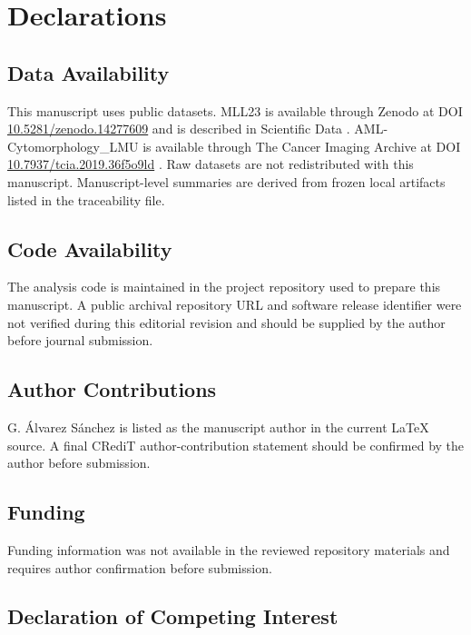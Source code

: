 \section*{Declarations}

\subsection*{Data Availability}

This manuscript uses public datasets. MLL23 is available through Zenodo at DOI \href{https://doi.org/10.5281/zenodo.14277609}{10.5281/zenodo.14277609} and is described in Scientific Data \cite{mll23_nature_2025,mll23_zenodo_2024}. AML-Cytomorphology\_LMU is available through The Cancer Imaging Archive at DOI \href{https://doi.org/10.7937/tcia.2019.36f5o9ld}{10.7937/tcia.2019.36f5o9ld} \cite{aml_lmu_tcia_2019}. Raw datasets are not redistributed with this manuscript. Manuscript-level summaries are derived from frozen local artifacts listed in the traceability file.

\subsection*{Code Availability}

The analysis code is maintained in the project repository used to prepare this manuscript. A public archival repository URL and software release identifier were not verified during this editorial revision and should be supplied by the author before journal submission.

\subsection*{Author Contributions}

G. Álvarez Sánchez is listed as the manuscript author in the current LaTeX source. A final CRediT author-contribution statement should be confirmed by the author before submission.

\subsection*{Funding}

Funding information was not available in the reviewed repository materials and requires author confirmation before submission.

\subsection*{Declaration of Competing Interest}

